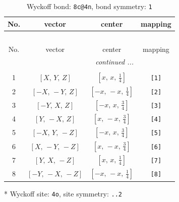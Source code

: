 \documentclass[fleqn,8pt]{jsarticle}
\begin{document}
\renewcommand{\arraystretch}{1.2}
\begin{longtable}{cccc}
\caption{Wyckoff bond: {\tt 8c@4n}, bond symmetry: {\tt 1}}
 \\
 \hline \hline
No. & vector & center & mapping \\ \hline \endfirsthead

\multicolumn{3}{l}{\tablename\ \thetable{}} \\
 \hline \hline
No. & vector & center & mapping \\ \hline \endhead

 \hline \hline
\multicolumn{3}{r}{\footnotesize\it continued ...} \\ \endfoot

 \hline \hline
\multicolumn{3}{r}{} \\ \endlastfoot

1 & $\left[ X,\, Y,\, Z \right]$ & $\left[ x,\, x,\, \frac{1}{4} \right]$ & {\tt [1]} \\ \hline
2 & $\left[ - X,\, - Y,\, Z \right]$ & $\left[ - x,\, - x,\, \frac{1}{4} \right]$ & {\tt [2]} \\ \hline
3 & $\left[ - Y,\, X,\, Z \right]$ & $\left[ - x,\, x,\, \frac{3}{4} \right]$ & {\tt [3]} \\ \hline
4 & $\left[ Y,\, - X,\, Z \right]$ & $\left[ x,\, - x,\, \frac{3}{4} \right]$ & {\tt [4]} \\ \hline
5 & $\left[ - X,\, Y,\, - Z \right]$ & $\left[ - x,\, x,\, \frac{3}{4} \right]$ & {\tt [5]} \\ \hline
6 & $\left[ X,\, - Y,\, - Z \right]$ & $\left[ x,\, - x,\, \frac{3}{4} \right]$ & {\tt [6]} \\ \hline
7 & $\left[ Y,\, X,\, - Z \right]$ & $\left[ x,\, x,\, \frac{1}{4} \right]$ & {\tt [7]} \\ \hline
8 & $\left[ - Y,\, - X,\, - Z \right]$ & $\left[ - x,\, - x,\, \frac{1}{4} \right]$ & {\tt [8]} \\
\end{longtable}
* Wyckoff site: {\tt 4o}, site symmetry: {\tt ..2}
\renewcommand{\arraystretch}{1.2}
\end{document}
